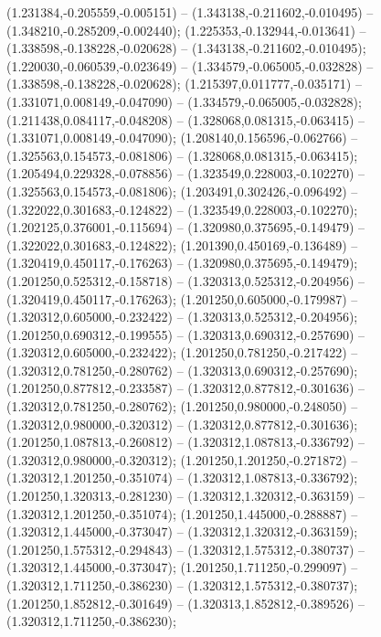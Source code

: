  (1.231384,-0.205559,-0.005151) -- (1.343138,-0.211602,-0.010495) -- (1.348210,-0.285209,-0.002440);
 (1.225353,-0.132944,-0.013641) -- (1.338598,-0.138228,-0.020628) -- (1.343138,-0.211602,-0.010495);
 (1.220030,-0.060539,-0.023649) -- (1.334579,-0.065005,-0.032828) -- (1.338598,-0.138228,-0.020628);
 (1.215397,0.011777,-0.035171) -- (1.331071,0.008149,-0.047090) -- (1.334579,-0.065005,-0.032828);
 (1.211438,0.084117,-0.048208) -- (1.328068,0.081315,-0.063415) -- (1.331071,0.008149,-0.047090);
 (1.208140,0.156596,-0.062766) -- (1.325563,0.154573,-0.081806) -- (1.328068,0.081315,-0.063415);
 (1.205494,0.229328,-0.078856) -- (1.323549,0.228003,-0.102270) -- (1.325563,0.154573,-0.081806);
 (1.203491,0.302426,-0.096492) -- (1.322022,0.301683,-0.124822) -- (1.323549,0.228003,-0.102270);
 (1.202125,0.376001,-0.115694) -- (1.320980,0.375695,-0.149479) -- (1.322022,0.301683,-0.124822);
 (1.201390,0.450169,-0.136489) -- (1.320419,0.450117,-0.176263) -- (1.320980,0.375695,-0.149479);
 (1.201250,0.525312,-0.158718) -- (1.320313,0.525312,-0.204956) -- (1.320419,0.450117,-0.176263);
 (1.201250,0.605000,-0.179987) -- (1.320312,0.605000,-0.232422) -- (1.320313,0.525312,-0.204956);
 (1.201250,0.690312,-0.199555) -- (1.320313,0.690312,-0.257690) -- (1.320312,0.605000,-0.232422);
 (1.201250,0.781250,-0.217422) -- (1.320312,0.781250,-0.280762) -- (1.320313,0.690312,-0.257690);
 (1.201250,0.877812,-0.233587) -- (1.320312,0.877812,-0.301636) -- (1.320312,0.781250,-0.280762);
 (1.201250,0.980000,-0.248050) -- (1.320312,0.980000,-0.320312) -- (1.320312,0.877812,-0.301636);
 (1.201250,1.087813,-0.260812) -- (1.320312,1.087813,-0.336792) -- (1.320312,0.980000,-0.320312);
 (1.201250,1.201250,-0.271872) -- (1.320312,1.201250,-0.351074) -- (1.320312,1.087813,-0.336792);
 (1.201250,1.320313,-0.281230) -- (1.320312,1.320312,-0.363159) -- (1.320312,1.201250,-0.351074);
 (1.201250,1.445000,-0.288887) -- (1.320312,1.445000,-0.373047) -- (1.320312,1.320312,-0.363159);
 (1.201250,1.575312,-0.294843) -- (1.320312,1.575312,-0.380737) -- (1.320312,1.445000,-0.373047);
 (1.201250,1.711250,-0.299097) -- (1.320312,1.711250,-0.386230) -- (1.320312,1.575312,-0.380737);
 (1.201250,1.852812,-0.301649) -- (1.320313,1.852812,-0.389526) -- (1.320312,1.711250,-0.386230);
